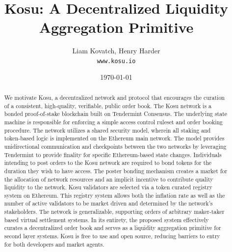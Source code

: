 \documentclass[10pt]{article}
\begin{document}

\title{\textbf{Kosu: A Decentralized Liquidity Aggregation Primitive}} 
\author{Liam Kovatch, Henry Harder \\\texttt{www.kosu.io}}
\date{\today}
\maketitle


\begin{abstract}
  \noindent We motivate Kosu, a decentralized network and protocol that encourages the curation of a consistent, high-quality, verifiable, public order book. The Kosu network is a bonded proof-of-stake blockchain built on Tendermint Consensus. The underlying state machine is responsible for enforcing a simple access control ruleset and order booking procedure. The network utilizes a shared security model, wherein all staking and token-based logic is implemented on the Ethereum main network. The model provides unidirectional communication and checkpoints between the two networks by leveraging Tendermint to provide finality for specific Ethereum-based state changes. Individuals intending to post orders to the Kosu network are required to bond tokens for the duration they wish to have access. The poster bonding mechanism creates a market for the allocation of network resources and an implicit incentive to contribute quality liquidity to the network. Kosu validators are selected via a token curated registry system on Ethereum. This registry system allows both the inflation rate as well as the number of active validators to be market driven and determined by the network’s stakeholders. The network is generalizable, supporting orders of arbitrary maker-taker based virtual settlement systems. In its entirety, the proposed system effectively curates a decentralized order book and serves as a liquidity aggregation primitive for second layer systems. Kosu is free to use and open source, reducing barriers to entry for both developers and market agents.
\end{abstract}
\pagebreak
\end{document}
